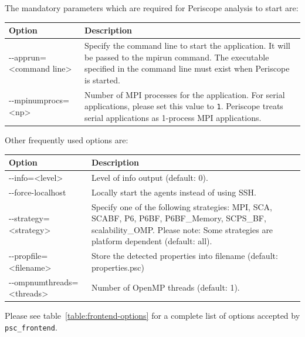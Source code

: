 \documentclass[11pt,oneside,a4paper]{book}
\begin{document}
The mandatory parameters which are required for Periscope analysis to start are:

\begin{center}
 \begin{longtable}{|l|p{6.5cm}|} %
  \hline %
  Option & Description \\
  \hline
  -{}-apprun=\textless command line\textgreater &
  Specify the command line to start the application. It will be passed to the mpirun command. \newline
  The executable specified in the command line must exist when Periscope is started. \\
  \hline
  -{}-mpinumprocs=\textless np\textgreater & Number of MPI processes for the
  application.\newline\newline
  For serial applications, please set this value to \texttt{1}. Periscope treats serial
  applications as 1-process MPI applications. \\
  \hline
 \end{longtable}
\end{center}

Other frequently used options are:
\begin{center}
 \begin{longtable}{|l|p{6.5cm}|} %
  \hline %
  Option & Description \\
  \hline
  -{}-info=\textless level\textgreater & Level of info output (default: 0). \\
  \hline
  -{}-force-localhost & Locally start the agents instead of using SSH. \\
  \hline
  -{}-strategy=\textless strategy\textgreater & Specify one of the following
  strategies: MPI, SCA, SCABF, P6, P6BF, P6BF\_Memory, SCPS\_BF,
  scalability\_OMP. Please note: Some strategies are platform dependent (default: all). \\
   \hline
  -{}-propfile=\textless filename\textgreater & Store the detected properties
  into filename (default: properties.psc) \\
  \hline
  -{}-ompnumthreads=\textless threads\textgreater & Number of OpenMP threads (default: 1).\\
  \hline
 \end{longtable}
\end{center}

Please see table~\ref{table:frontend-options} for a complete list of options accepted by \texttt{psc\_frontend}.
\end{document}

